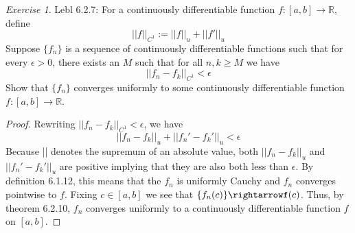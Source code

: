 \documentclass[12pt,oneside]{amsart}
\theoremstyle{definition}
\theoremstyle{remark}
\newtheorem{exer}{Exercise}
\numberwithin{equation}{exer}
\begin{document}
\newpage


\begin{exer}
Lebl 6.2.7: For a continuously differentiable function $f:[a,b]\rightarrow\mathbb{R}$, define $$||f||_{C^1}:=||f||_u+||f'||_u$$Suppose $\{f_n\}$ is a sequence of continuously differentiable functions such that for every $\epsilon>0$, there exists an $M$ such that for all $n,k\geq M$ we have $$||f_n-f_k||_{C^1}<\epsilon$$Show that $\{f_n\}$ converges uniformly to some continuously differentiable function $f:[a,b]\rightarrow\mathbb{R}$.
\end{exer}
\begin{proof}
Rewriting $||f_n-f_k||_{C^1}<\epsilon$, we have
$$||f_n-f_k||_u+||f_n'-f_k'||_u<\epsilon$$
Because || denotes the supremum of an absolute value, both $||f_n-f_k||_u$ and $||f_n'-f_k'||_u$ are positive implying that they are also both less than $\epsilon$. By definition 6.1.12, this means that the $f_n$ is uniformly Cauchy and $f_n$ converges pointwise to $f$. Fixing $c\in[a,b]$ we see that $\{f_n(c)\}\rightarrowf(c)$. Thus, by theorem 6.2.10, $f_n$ converges uniformly to a continuously differentiable function $f$ on $[a,b]$.
\end{proof}
\end{document}
